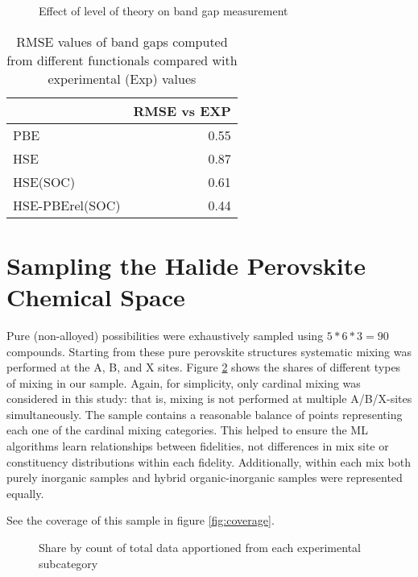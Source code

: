  
\begin{figure}[htbp]
\centering

\caption{\label{fig:expqual} Effect of level of theory on band gap measurement}
\end{figure}

 
\begin{table}[htbp]
\caption{\label{tbl:expquant} RMSE values of band gaps computed from different functionals compared with experimental (Exp) values}
\centering
\begin{tabular}{lr}
 & RMSE vs EXP\\[0pt]
\hline
PBE & 0.55\\[0pt]
HSE & 0.87\\[0pt]
HSE(SOC) & 0.61\\[0pt]
HSE-PBErel(SOC) & 0.44\\[0pt]
\end{tabular}
\end{table}

\section{Sampling the Halide Perovskite Chemical Space}
\label{sec:orgcf27dc8}
Pure (non-alloyed) possibilities were exhaustively sampled using \(5*6*3 = 90\) compounds.
Starting from these pure perovskite structures systematic mixing was performed at the A, B, and X sites.
Figure \ref{fig:lot_mix_org} shows the shares of different types of mixing in our sample.
Again, for simplicity, only cardinal mixing was considered in this study: that is, mixing is not performed at multiple A/B/X-sites simultaneously.
The sample contains a reasonable balance of points representing each one of the cardinal mixing categories.
This helped to ensure the ML algorithms learn relationships between fidelities, not differences in mix site or constituency distributions within each fidelity.
Additionally, within each mix both purely inorganic samples and hybrid organic-inorganic samples were represented equally.

See the coverage of this sample in figure \ref{fig:coverage}.

 
\begin{figure}[htbp]
\centering

\caption{\label{fig:lot_mix_org} Share by count of total data apportioned from each experimental subcategory}
\end{figure}

